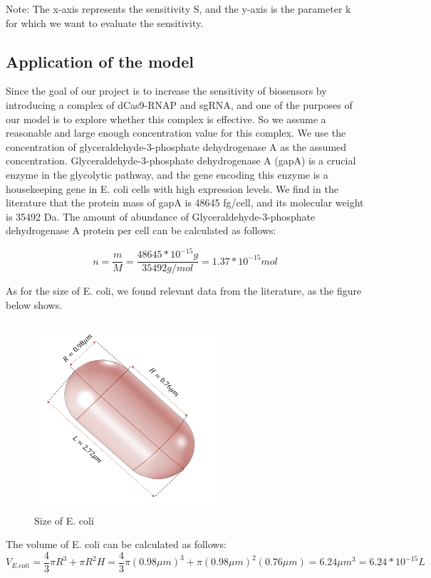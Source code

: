 Note: The x-axis represents the sensitivity S, and the y-axis is the parameter k for which we want to evaluate the sensitivity.

\subsection{Application of the model}
Since the goal of our project is to increase the sensitivity of biosensors by introducing a complex of dCas9-RNAP and sgRNA, and one of the purposes of our model is to explore whether this complex is effective. So we assume a reasonable and large enough concentration value for this complex. We use the concentration of glyceraldehyde-3-phosphate dehydrogenase A as the assumed concentration. Glyceraldehyde-3-phosphate dehydrogenase A (gapA) is a crucial enzyme in the glycolytic pathway, and the gene encoding this enzyme is a housekeeping gene in E. coli cells with high expression levels. We find in the literature that the protein mass of gapA is 48645 fg/cell, and its molecular weight is 35492 Da.\cite{ishihama2005exponentially} The amount of abundance of Glyceraldehyde-3-phosphate dehydrogenase A protein per cell can be calculated as follows:

\begin{displaymath}
	n=\frac{m}{M}=\frac{48645*10^{-15}g}{35492g/mol}=1.37*10^{-15}mol
\end{displaymath}

As for the size of E. coli, we found relevant data from the literature, as the figure below shows.\cite{grossman1982changes}

\begin{figure}[!htbp]
	\centering
	\includegraphics[width=7cm,height=7cm]{dc}
	\caption{Size of E. coli}
\end{figure}

The volume of E. coli can be calculated as follows:
\begin{displaymath}
	V_{E.coli}=\frac{4}{3} \pi R^3+\pi R^2H=\frac{4}{3} \pi (0.98\mu m)^3+\pi (0.98\mu m)^2(0.76\mu m)=6.24\mu m^3=6.24*10^{-15}L
\end{displaymath}

